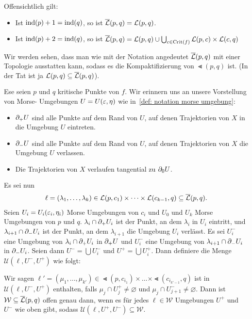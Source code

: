 Offensichtlich gilt:
\begin{itemize}
    \item Ist ${ \operatorname{ind} } (p) + 1 = { \operatorname{ind} } (q)$, so ist ${\overline{\mathcal{L}} } (p, q) = { \mathcal{L} } (p, q)$.
    \item Ist ${ \operatorname{ind} } (p) + 2 = { \operatorname{ind} } (q)$, so ist 
        ${\overline{\mathcal{L}} } (p, q) = { \mathcal{L} } (p, q) \cup \bigcup_{c \in { \operatorname{Crit} } (f)} { \mathcal{L} }(p, c) \times { \mathcal{L} }(c, q)$
\end{itemize}

Wir werden sehen, dass man wie mit der Notation angedeutet ${\overline{\mathcal{L}} } (p, q)$ mit einer Topologie ausstatten 
kann, sodass es die Kompaktifizierung von $\Lt (p, q)$ ist. (In der Tat ist ja 
${ \mathcal{L} } (p, q) \subseteq {\overline{\mathcal{L}} } (p, q)$).

\begin{definition}
    Ese seien $p$ und $q$ kritische Punkte von $f$. Wir erinnern uns an unsere Vorstellung von Morse-
    Umgebungen $U = U(\varepsilon, \eta)$ wie in~\ref{def: notation morse umgebung}:
    \begin{itemize}
        \item ${ \partial }_+ U$ sind alle Punkte auf dem Rand von $U$, auf denen Trajektorien von $X$ in 
            die Umgebung $U$ eintreten.
        \item ${ \partial }_- U$ sind alle Punkte auf dem Rand von $U$, auf denen Trajektorien von $X$ die
            Umgebung $U$ verlassen.
        \item Die Trajektorien von $X$ verlaufen tangential zu ${ \partial }_0 U$.
    \end{itemize}
    Es sei nun 
    \[ \ell = (\lambda_1, \dots, \lambda_k) 
        \in { \mathcal{L} } (p, c_1) \times \dots \times { \mathcal{L} }(c_{k - 1}, q) \subseteq {\overline{\mathcal{L}} } (p, q) . \]
    Seien $U_i = U_i (\varepsilon_i, \eta_i)$ Morse Umgebungen von $c_i$ und $U_0$ und $U_k$ Morse 
    Umgebungen von $p$ und $q$. $\lambda_i \cap { \partial }_+ U_i$ ist der Punkt, an dem $\lambda_i$
    in $U_i$ eintritt, und $\lambda_{i + 1} \cap { \partial }_- U_i$ ist der Punkt, an dem $\lambda_{i + 1}$
    die Umgebung $U_i$ verlässt. Es sei $U_i^-$ eine Umgebung von $\lambda_i \cap { \partial }_+ U_i$ in 
    ${ \partial }_+ U$ und $U_i^-$ eine Umgebung von $\lambda_{i + 1} \cap { \partial }_- U_i$ in ${ \partial }_- U_i$. 
    Seien dann $U^- = \bigcup U_i^-$ und $U^+ = \bigcup U_i^+$. Dann definiere die Menge 
    $\mathcal{U} (\ell, U^-, U^+)$ wie folgt:

    Wir sagen 
    $\ell' = (\mu_1, ..., \mu_{k'}) \in \Lt (p, c_{i_1}) \times \dots \times \Lt (c_{i_{k'-1}}, q)$
    ist in $\mathcal{U}(\ell, U^-, U^+)$ enthalten, falls $\mu_j \cap U_j^+ \neq \varnothing$
    und $\mu_j \cap U_{j + 1}^- \neq \varnothing$. 
    Dann ist $\mathcal{W} \subseteq {\overline{\mathcal{L}} } (p, q)$ offen genau dann, wenn es für jedes 
    $\ell \in \mathcal{W}$ Umgebungen $U^+$ und $U^-$ wie oben gibt, sodass 
    $\mathcal{U}(\ell, U^+, U^-) \subseteq \mathcal{W}$.
\end{definition}

